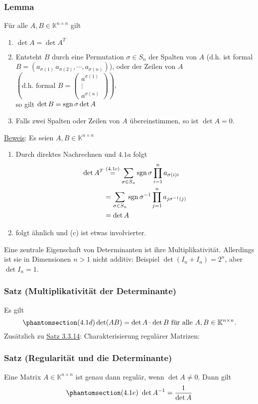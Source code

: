 \subsubsection{Lemma}
Für alle $A,B\in\mathbb{K}^{n\times n}$ gilt
\renewcommand{\labelenumi}{(\alph{enumi})}
\begin{enumerate}
\item $\det A=\det A^T$
\item Entsteht $B$ durch eine Permutation $\sigma \in S_n$ der Spalten von $A$ (d.h. ist formal $B=(a_{\sigma (1)}\,a_{\sigma (2)},\cdots ,a_{\sigma (n)})$), oder der Zeilen von $A$ $\left(\text{d.h. formal }B=\begin{pmatrix}a^{\sigma (1)}\\ \vdots \\ a^{\sigma (n)}\end{pmatrix}\right)$,\\
so gilt $\det B=\operatorname{sgn} \sigma\det A$
\item Falls zwei Spalten oder Zeilen von $A$ übereinstimmen, so ist $\det A=0$.
\end{enumerate}
\underline{Beweis}: Es seien $A,B\in\mathbb{K}^{n\times n}$
\begin{enumerate}
\item Durch direktes Nachrechnen und \hyperref[4.1a]{$4.1a$} folgt 
\begin{align*}
\det A^T&\stackrel{(4.1c)}{=}\sum _{\sigma\in S_n}\operatorname{sgn} \sigma \prod _{i=1}^n a_{\sigma (i)i}\\
&=\sum _{\sigma \in S_n} \operatorname{sgn} \sigma ^{-1}\prod _{j=1}^n a_{j\sigma ^{-1}(j)}\\
&= \det A
\end{align*}
\item folgt ähnlich und (c) ist etwas involvierter.
\end{enumerate}
Eine zentrale Eigenschaft von Determinanten ist ihre Multiplikativität.  Allerdings ist sie in Dimensionen $n>1$ nicht additiv: Beispiel $\det (I_n+I_n)=2^n$, aber $\det I_n=1$.
\subsubsection{Satz (Multiplikativität der Determinante)}
\label{4.1.10}
Es gilt \[\phantomsection\label{4.1d}(4.1d)\det (AB)=\det A\cdot\det B\text{ für alle }A,B\in\mathbb{K}^{n\times n}.\]
Zusätzlich zu \hyperref[3.3.14]{Satz 3.3.14}: Charakterisierung regulärer Matrizen: 
\subsubsection{Satz (Regularität und die Determinante)}
\label{4.1.11}
Eine Matrix $A\in\mathbb{K}^{n\times n}$ ist genau dann regulär, wenn $\det A\not= 0$.  Dann gilt
\[\phantomsection\label{4.1e}(4.1e)\ \det A^{-1}=\frac{1}{\det A}\]
